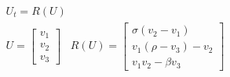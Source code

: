 \documentclass[10pt]{article} %
\begin{document}
\color{fgC}\[\begin{matrix}
 U_t = R(U)  \\ 
 U = \begin{bmatrix}
 v_1 \\ 
 v_2 \\
 v_3
 \end{bmatrix}\;\;\;
 R(U) = \begin{bmatrix}
 \sigma (v_2-v_1) \\ 
 v_1(\rho - v_3) -v_2 \\
v_1 v_2 - \beta v_3
 \end{bmatrix} 
\end{matrix}\]
\end{document}
